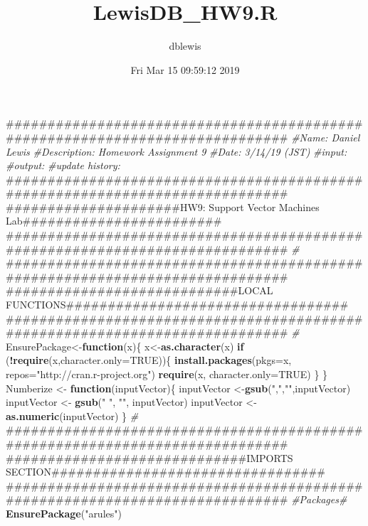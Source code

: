 \documentclass[]{article}
\title{LewisDB\_HW9.R}
\author{dblewis}
\date{Fri Mar 15 09:59:12 2019}
\newenvironment{Shaded}{\begin{snugshade}}{\end{snugshade}}
\newcommand{\KeywordTok}[1]{\textcolor[rgb]{0.13,0.29,0.53}{\textbf{#1}}}
\newcommand{\DataTypeTok}[1]{\textcolor[rgb]{0.13,0.29,0.53}{#1}}
\newcommand{\StringTok}[1]{\textcolor[rgb]{0.31,0.60,0.02}{#1}}
\newcommand{\CommentTok}[1]{\textcolor[rgb]{0.56,0.35,0.01}{\textit{#1}}}
\newcommand{\OtherTok}[1]{\textcolor[rgb]{0.56,0.35,0.01}{#1}}
\newcommand{\ControlFlowTok}[1]{\textcolor[rgb]{0.13,0.29,0.53}{\textbf{#1}}}
\newcommand{\OperatorTok}[1]{\textcolor[rgb]{0.81,0.36,0.00}{\textbf{#1}}}
\newcommand{\NormalTok}[1]{#1}
\begin{document}
\maketitle

\begin{Shaded}
\begin{Highlighting}[]
\NormalTok{#############################################################################}
\CommentTok{#Name: Daniel Lewis}
\CommentTok{#Description: Homework Assignment 9}
\CommentTok{#Date: 3/14/19 (JST)}
\CommentTok{#input: }
\CommentTok{#output: }
\CommentTok{#update history:}
\NormalTok{#############################################################################}
\NormalTok{#####################HW9: Support Vector Machines Lab########################}
\NormalTok{#############################################################################}
\CommentTok{#}
\NormalTok{#############################################################################}
\NormalTok{############################LOCAL FUNCTIONS##################################}
\NormalTok{#############################################################################}
\CommentTok{#}
\NormalTok{EnsurePackage<-}\ControlFlowTok{function}\NormalTok{(x)\{}
\NormalTok{   x<-}\KeywordTok{as.character}\NormalTok{(x)}
   \ControlFlowTok{if}\NormalTok{ (}\OperatorTok{!}\KeywordTok{require}\NormalTok{(x,}\DataTypeTok{character.only=}\OtherTok{TRUE}\NormalTok{))\{}
       \KeywordTok{install.packages}\NormalTok{(}\DataTypeTok{pkgs=}\NormalTok{x, }\DataTypeTok{repos=}\StringTok{"http://cran.r-project.org"}\NormalTok{)}
       \KeywordTok{require}\NormalTok{(x, }\DataTypeTok{character.only=}\OtherTok{TRUE}\NormalTok{)}
\NormalTok{     \}}
\NormalTok{\}}
\NormalTok{Numberize <-}\StringTok{ }\ControlFlowTok{function}\NormalTok{(inputVector)\{}
\NormalTok{  inputVector <-}\KeywordTok{gsub}\NormalTok{(}\StringTok{","}\NormalTok{,}\StringTok{""}\NormalTok{,inputVector)}
\NormalTok{  inputVector <-}\StringTok{ }\KeywordTok{gsub}\NormalTok{(}\StringTok{" "}\NormalTok{, }\StringTok{""}\NormalTok{, inputVector)}
\NormalTok{  inputVector <-}\StringTok{  }\KeywordTok{as.numeric}\NormalTok{(inputVector)}
\NormalTok{\}}
\CommentTok{#}
\NormalTok{#############################################################################}
\NormalTok{#############################IMPORTS SECTION#################################}
\NormalTok{#############################################################################}
\CommentTok{#Packages#}
\KeywordTok{EnsurePackage}\NormalTok{(}\StringTok{"arules"}\NormalTok{)}
\end{Highlighting}
\end{Shaded}
\end{document}
